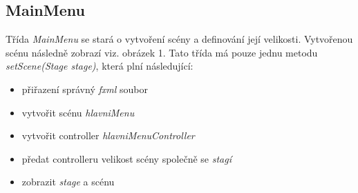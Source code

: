 \subsection{MainMenu}
Třída \textit{MainMenu} se stará o vytvoření scény a definování její velikosti. Vytvořenou scénu následně zobrazí viz. obrázek 1. Tato třída má pouze jednu metodu \textit{setScene(Stage stage)}, která plní následující:
\begin{itemize}
    \item přiřazení správný \textit{fxml} soubor
    \item vytvořit scénu \textit{hlavniMenu}
    \item vytvořit controller \textit{hlavniMenuController}
    \item předat controlleru velikost scény společně se \textit{stagí}
    \item zobrazit \textit{stage} a scénu
\end{itemize}